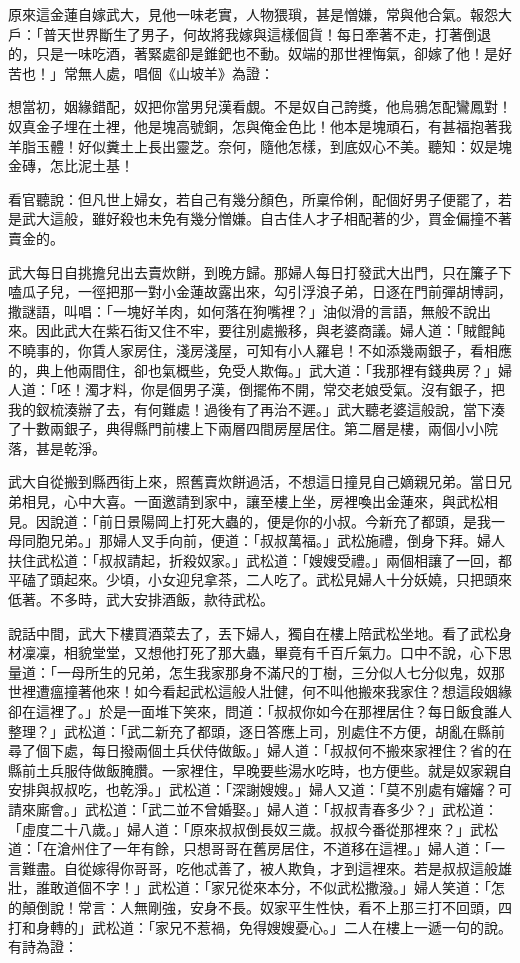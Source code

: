 \begin{showcontents}{}
原來這金蓮自嫁武大，見他一味老實，人物猥瑣，甚是憎嫌，常與他合氣。報怨大戶：「普天世界斷生了男子，何故將我嫁與這樣個貨！每日牽著不走，打著倒退的，只是一味吃酒，著緊處卻是錐鈀也不動。奴端的那世裡悔氣，卻嫁了他！是好苦也！」常無人處，唱個《山坡羊》為證：

想當初，姻緣錯配，奴把你當男兒漢看覷。不是奴自己誇獎，他烏鴉怎配鸞鳳對！奴真金子埋在土裡，他是塊高號銅，怎與俺金色比！他本是塊頑石，有甚福抱著我羊脂玉體！好似糞土上長出靈芝。奈何，隨他怎樣，到底奴心不美。聽知：奴是塊金磚，怎比泥土基！

看官聽說：但凡世上婦女，若自己有幾分顏色，所稟伶俐，配個好男子便罷了，若是武大這般，雖好殺也未免有幾分憎嫌。自古佳人才子相配著的少，買金偏撞不著賣金的。

武大每日自挑擔兒出去賣炊餅，到晚方歸。那婦人每日打發武大出門，只在簾子下嗑瓜子兒，一徑把那一對小金蓮故露出來，勾引浮浪子弟，日逐在門前彈胡博詞，撒謎語，叫唱：「一塊好羊肉，如何落在狗嘴裡？」油似滑的言語，無般不說出來。因此武大在紫石街又住不牢，要往別處搬移，與老婆商議。婦人道：「賊餛飩不曉事的，你賃人家房住，淺房淺屋，可知有小人羅皂！不如添幾兩銀子，看相應的，典上他兩間住，卻也氣概些，免受人欺侮。」武大道：「我那裡有錢典房？」婦人道：「呸！濁才料，你是個男子漢，倒擺佈不開，常交老娘受氣。沒有銀子，把我的釵梳湊辦了去，有何難處！過後有了再治不遲。」武大聽老婆這般說，當下湊了十數兩銀子，典得縣門前樓上下兩層四間房屋居住。第二層是樓，兩個小小院落，甚是乾淨。

武大自從搬到縣西街上來，照舊賣炊餅過活，不想這日撞見自己嫡親兄弟。當日兄弟相見，心中大喜。一面邀請到家中，讓至樓上坐，房裡喚出金蓮來，與武松相見。因說道：「前日景陽岡上打死大蟲的，便是你的小叔。今新充了都頭，是我一母同胞兄弟。」那婦人叉手向前，便道：「叔叔萬福。」武松施禮，倒身下拜。婦人扶住武松道：「叔叔請起，折殺奴家。」武松道：「嫂嫂受禮。」兩個相讓了一回，都平磕了頭起來。少頃，小女迎兒拿茶，二人吃了。武松見婦人十分妖嬈，只把頭來低著。不多時，武大安排酒飯，款待武松。

說話中間，武大下樓買酒菜去了，丟下婦人，獨自在樓上陪武松坐地。看了武松身材凜凜，相貌堂堂，又想他打死了那大蟲，畢竟有千百斤氣力。口中不說，心下思量道：「一母所生的兄弟，怎生我家那身不滿尺的丁樹，三分似人七分似鬼，奴那世裡遭瘟撞著他來！如今看起武松這般人壯健，何不叫他搬來我家住？想這段姻緣卻在這裡了。」於是一面堆下笑來，問道：「叔叔你如今在那裡居住？每日飯食誰人整理？」武松道：「武二新充了都頭，逐日答應上司，別處住不方便，胡亂在縣前尋了個下處，每日撥兩個土兵伏侍做飯。」婦人道：「叔叔何不搬來家裡住？省的在縣前土兵服侍做飯腌臢。一家裡住，早晚要些湯水吃時，也方便些。就是奴家親自安排與叔叔吃，也乾淨。」武松道：「深謝嫂嫂。」婦人又道：「莫不別處有嬸嬸？可請來廝會。」武松道：「武二並不曾婚娶。」婦人道：「叔叔青春多少？」武松道：「虛度二十八歲。」婦人道：「原來叔叔倒長奴三歲。叔叔今番從那裡來？」武松道：「在滄州住了一年有餘，只想哥哥在舊房居住，不道移在這裡。」婦人道：「一言難盡。自從嫁得你哥哥，吃他忒善了，被人欺負，才到這裡來。若是叔叔這般雄壯，誰敢道個不字！」武松道：「家兄從來本分，不似武松撒潑。」婦人笑道：「怎的顛倒說！常言：人無剛強，安身不長。奴家平生性快，看不上那三打不回頭，四打和身轉的」武松道：「家兄不惹禍，免得嫂嫂憂心。」二人在樓上一遞一句的說。有詩為證：


\end{showcontents}
